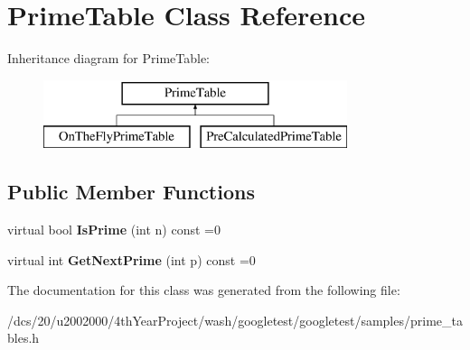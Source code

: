 \hypertarget{classPrimeTable}{}\section{Prime\+Table Class Reference}
\label{classPrimeTable}
Inheritance diagram for Prime\+Table\+:\begin{figure}[H]
\begin{center}
\leavevmode
\includegraphics[height=2.000000cm]{classPrimeTable}
\end{center}
\end{figure}
\subsection*{Public Member Functions}
\begin{DoxyCompactItemize}
\item 
\mbox{\label{classPrimeTable_a2ab9243364ded0c51541f641b2df362a}} 
virtual bool {\bfseries Is\+Prime} (int n) const =0
\item 
\mbox{\label{classPrimeTable_ae537c939f56617d8937d57bbbae3ab30}} 
virtual int {\bfseries Get\+Next\+Prime} (int p) const =0
\end{DoxyCompactItemize}


The documentation for this class was generated from the following file\+:\begin{DoxyCompactItemize}
\item 
/dcs/20/u2002000/4th\+Year\+Project/wash/googletest/googletest/samples/prime\+\_\+tables.\+h\end{DoxyCompactItemize}
